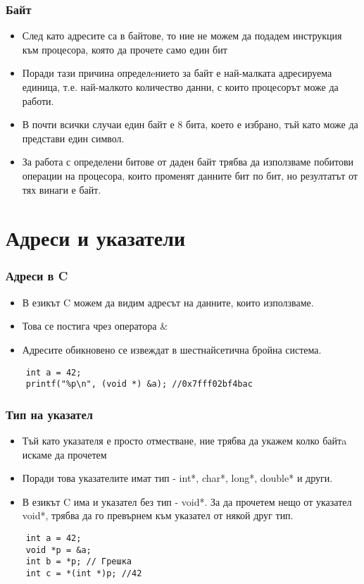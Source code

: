 \documentclass[ignorenonframetext, hyperref=unicode]{beamer}
\begin{document}
\begin{frame}
\frametitle{Байт}
\begin{itemize}
  \item След като адресите са в байтове, то ние не можем да подадем инструкция към процесора, която да прочете само един бит
  \item Поради тази причина определeнието за байт е най-малката адресируема единица, т.е. най-малкото количество данни, с които процесорът може да работи.
  \item В почти всички случаи един байт е 8 бита, което е избрано, тъй като може да представи един символ.
  \item За работа с определени битове от даден байт трябва да използваме побитови операции на процесора, които променят данните бит по бит, но резултатът от тях винаги е байт.
\end{itemize}
\end{frame}


\section{Адреси и указатели}


\begin{frame}[containsverbatim]
\frametitle{Адреси в C}
\begin{itemize}
  \item В езикът C можем да видим адресът на данните, които използваме.
  \item Това се постига чрез оператора \&
  \item Адресите обикновено се извеждат в шестнайсетична бройна система.
\end{itemize}
\begin{lstlisting}
	int a = 42;
	printf("%p\n", (void *) &a); //0x7fff02bf4bac
\end{lstlisting}

\end{frame}

\begin{frame}[containsverbatim]
\frametitle{Тип на указател}
\begin{itemize}
  \item Тъй като указателя е просто отместване, ние трябва да укажем колко байтa искаме да прочетем
  \item Поради това указателите имат тип - int*, char*, long*, double* и други.
  \item В езикът C има и указател без тип - void*. За да прочетем нещо от указател void*, трябва да го превърнем към указател от някой друг тип.
\end{itemize}
\begin{lstlisting}
	int a = 42;
	void *p = &a;
	int b = *p; // Грешка
	int c = *(int *)p; //42
\end{lstlisting}
\end{frame}
\end{document}
